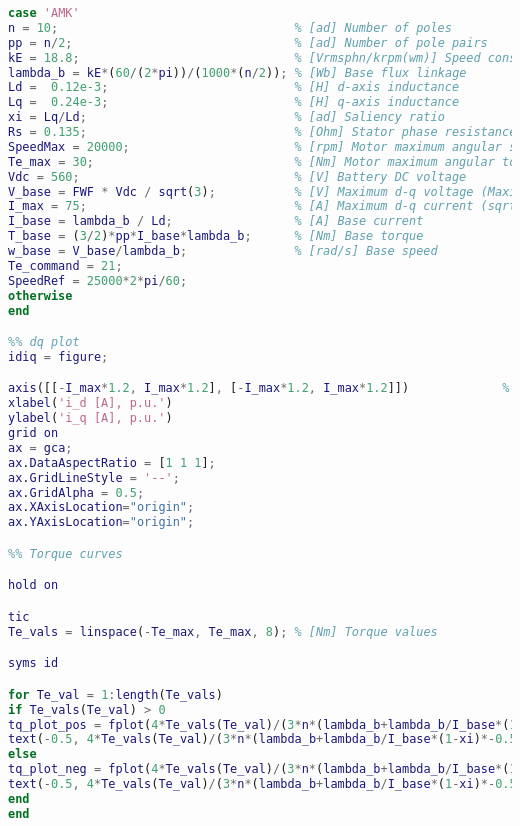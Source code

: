 \begin{lstlisting}[language=Matlab, basicstyle=\ttfamily\small, breaklines=true, frame=single]
case 'AMK'
n = 10;                                 % [ad] Number of poles 
pp = n/2;                               % [ad] Number of pole pairs
kE = 18.8;                              % [Vrmsphn/krpm(wm)] Speed constant 
lambda_b = kE*(60/(2*pi))/(1000*(n/2)); % [Wb] Base flux linkage
Ld =  0.12e-3;                          % [H] d-axis inductance
Lq =  0.24e-3;                          % [H] q-axis inductance
xi = Lq/Ld;                             % [ad] Saliency ratio
Rs = 0.135;                             % [Ohm] Stator phase resistance (phase-to-phase/2)
SpeedMax = 20000;                       % [rpm] Motor maximum angular speed
Te_max = 30;                            % [Nm] Motor maximum angular torque
Vdc = 560;                              % [V] Battery DC voltage
V_base = FWF * Vdc / sqrt(3);           % [V] Maximum d-q voltage (Maximum Torque per Voltage Flux-Weakening strategy with speed limiter for PMSM drives, 2020)
I_max = 75;                             % [A] Maximum d-q current (sqrt(i_d^2+i_q^2))
I_base = lambda_b / Ld;                 % [A] Base current
T_base = (3/2)*pp*I_base*lambda_b;      % [Nm] Base torque
w_base = V_base/lambda_b;               % [rad/s] Base speed
Te_command = 21;
SpeedRef = 25000*2*pi/60;
otherwise
end

%% dq plot
idiq = figure;

axis([[-I_max*1.2, I_max*1.2], [-I_max*1.2, I_max*1.2]])             % [A] Current maximum values
xlabel('i_d [A], p.u.') 
ylabel('i_q [A], p.u.') 
grid on
ax = gca;
ax.DataAspectRatio = [1 1 1];
ax.GridLineStyle = '--';
ax.GridAlpha = 0.5;
ax.XAxisLocation="origin";
ax.YAxisLocation="origin";

%% Torque curves

hold on

tic
Te_vals = linspace(-Te_max, Te_max, 8); % [Nm] Torque values

syms id

for Te_val = 1:length(Te_vals)
if Te_vals(Te_val) > 0
tq_plot_pos = fplot(4*Te_vals(Te_val)/(3*n*(lambda_b+lambda_b/I_base*(1-xi)*id)), 'm', 'LineWidth', 2); % IPMSM torque equation, solved for iq
text(-0.5, 4*Te_vals(Te_val)/(3*n*(lambda_b+lambda_b/I_base*(1-xi)*-0.5)), sprintf('%.1f Nm',Te_vals(Te_val)),'Color','magenta','FontSize',12)
else 
tq_plot_neg = fplot(4*Te_vals(Te_val)/(3*n*(lambda_b+lambda_b/I_base*(1-xi)*id)), 'r', 'LineWidth', 2); % IPMSM torque equation, solved for iq
text(-0.5, 4*Te_vals(Te_val)/(3*n*(lambda_b+lambda_b/I_base*(1-xi)*-0.5)), sprintf('%.1f Nm',Te_vals(Te_val)),'Color','red','FontSize',12)
end
end


\end{lstlisting}
